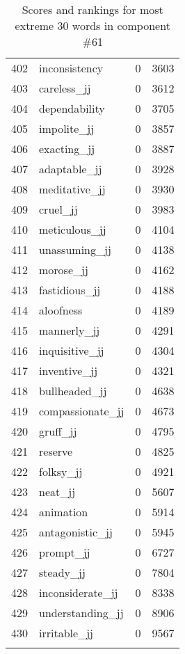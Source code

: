 \begin{longtable}[!htbp]{| rlr@{.}l |}
    402 & inconsistency & 0 & 3603 \\
    403 & careless\_jj & 0 & 3612 \\
    404 & dependability & 0 & 3705 \\
    405 & impolite\_jj & 0 & 3857 \\
    406 & exacting\_jj & 0 & 3887 \\
    407 & adaptable\_jj & 0 & 3928 \\
    408 & meditative\_jj & 0 & 3930 \\
    409 & cruel\_jj & 0 & 3983 \\
    410 & meticulous\_jj & 0 & 4104 \\
    411 & unassuming\_jj & 0 & 4138 \\
    412 & morose\_jj & 0 & 4162 \\
    413 & fastidious\_jj & 0 & 4188 \\
    414 & aloofness & 0 & 4189 \\
    415 & mannerly\_jj & 0 & 4291 \\
    416 & inquisitive\_jj & 0 & 4304 \\
    417 & inventive\_jj & 0 & 4321 \\
    418 & bullheaded\_jj & 0 & 4638 \\
    419 & compassionate\_jj & 0 & 4673 \\
    420 & gruff\_jj & 0 & 4795 \\
    421 & reserve & 0 & 4825 \\
    422 & folksy\_jj & 0 & 4921 \\
    423 & neat\_jj & 0 & 5607 \\
    424 & animation & 0 & 5914 \\
    425 & antagonistic\_jj & 0 & 5945 \\
    426 & prompt\_jj & 0 & 6727 \\
    427 & steady\_jj & 0 & 7804 \\
    428 & inconsiderate\_jj & 0 & 8338 \\
    429 & understanding\_jj & 0 & 8906 \\
    430 & irritable\_jj & 0 & 9567 \\
    \hline
    \caption{Scores and rankings for most extreme 30 words in component \#61} \\
\end{longtable}
